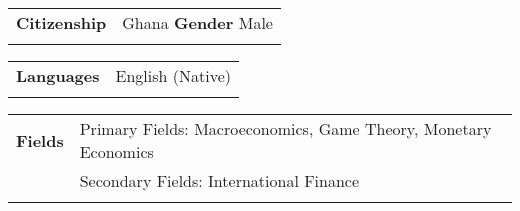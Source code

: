 \documentclass[final]{article}
\begin{document}
\begin{tabular}{@{} l l}
 \Large\textbf {Citizenship}    & \hspace{3ex} {Ghana} \hspace{25ex} \textbf{Gender}  \hspace{5ex} Male \\
     & \\
\end{tabular}

\vspace{.1in}
\begin{tabular}{@{} l l}
 \Large\textbf {Languages}    & \hspace{4.5ex} {English (Native)} \\
     & \\
\end{tabular}


\vspace{.1in}
\begin{tabular}{@{} l l}
 \Large\textbf {Fields}    & \hspace{12ex} {Primary Fields: Macroeconomics, Game Theory, Monetary Economics} \\
     & \hspace{12ex} {Secondary Fields: International Finance} \\
     & \\
\end{tabular}

\end{document}

